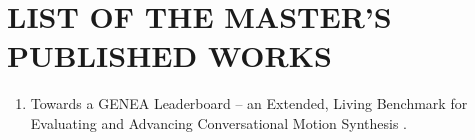 \chapter*{LIST OF THE MASTER’S PUBLISHED WORKS}
\label{AppendixAuthor}

\begin{enumerate}
	\item Towards a GENEA Leaderboard -- an Extended, Living Benchmark for Evaluating and Advancing Conversational Motion Synthesis \cite{nagy2024towards}.
\end{enumerate}

%

